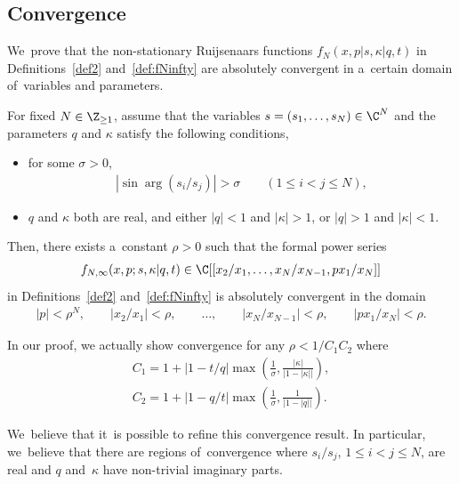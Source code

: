 \subsection{Convergence}\label{sec:convergence}

We~prove that the non-stationary Ruijsenaars functions $f_N\!(x,p|s,\kappa|q,t)$ in Definitions~\ref{def2} and~\ref{def:fNinfty} are absolutely convergent in a~certain domain of~variables and parameters.

\begin{Theorem}\label{thm:converegence}
For fixed $N\in\Z_{\geq 1}$, assume that the variables $s=(s_1,\dots,s_N)\in\C^N$ and the parameters $q$ and $\kappa$ satisfy the following conditions,
\begin{itemize}\itemsep=0pt
\item[$(i)$] for some $\sigma>0$,
\begin{gather*}
{}|\sin\arg(s_i/s_j)|>\sigma \qquad (1\leq i<j\leq N),
\end{gather*}
\item[$(ii)$] $q$ and $\kappa$ both are real, and either $|q|<1$ and $|\kappa|>1$, or $|q|>1$ and $|\kappa|<1$.
\end{itemize}
Then, there exists a~constant $\rho>0$ such that the formal power series
\begin{gather*}
f_{N,\infty}(x,p;s,\kappa|q,t)\in \C[[x_2/x_1,\dots,x_N/x_{N-1},px_1/x_N]]
\end{gather*}
in Definitions~{\rm \ref{def2}} and~{\rm \ref{def:fNinfty}} is absolutely convergent in the domain
\begin{gather}\label{xcond}
|p|<\rho^N,\qquad |x_2/x_1|<\rho,\qquad \dots,\qquad |x_N/x_{N-1}|<\rho,\qquad |px_1/x_N|<\rho.
\end{gather}
\end{Theorem}
\begin{Remark}In our proof, we actually show convergence for any $\rho<1/C_1C_2$ where
\begin{gather}
C_1= 1+|1-t/q|\max\left(\frac1{\sigma}, \frac{|\kappa|}{|1-|\kappa||}\right)\!,\nonumber\\
C_2= 1+|1-q/t|\max\left(\frac1{\sigma},\frac{1}{|1-|q||}\right)\!.\label{C1C2}
\end{gather}
\end{Remark}
\begin{Remark}
We~believe that it~is possible to refine this convergence result. In particular, we~believe that there are regions of~convergence where $s_i/s_j$, $1\leq i<j\leq N$, are real and $q$ and~$\kappa$ have non-trivial imaginary parts.
\end{Remark}

